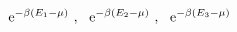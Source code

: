 \begin{equation}
{\rm e}^{-\beta(E_1-\mu)} \ , \ \ {\rm e}^{-\beta(E_2-\mu)} \ , \ \ {\rm e}^{-\beta(E_3-\mu)}
\label{t24}
\end{equation}

